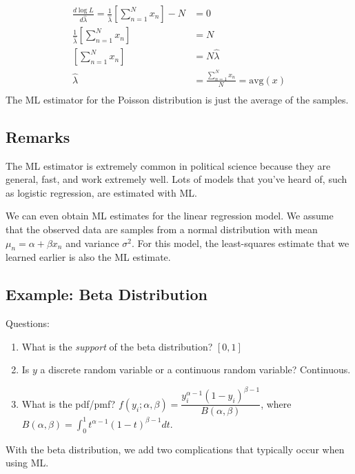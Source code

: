 \documentclass[
]{book}
\providecommand{\tightlist}{%
  \setlength{\itemsep}{0pt}\setlength{\parskip}{0pt}}
\begin{document}
\[
\begin{aligned}
\frac{d \log L}{d\hat{\lambda}} = \frac{1}{\hat{\lambda}} \left[ \sum_{n = 1}^N x_n \right] - N &= 0\\
\frac{1}{\hat{\lambda}} \left[ \sum_{n = 1}^N x_n \right] &= N \\
\left[ \sum_{n = 1}^N x_n \right] &= N \hat{\lambda} \\
\hat{\lambda} &= \frac{ \sum_{n = 1}^N x_n }{N} = \text{avg}(x)  \\
\end{aligned}
\]
The ML estimator for the Poisson distribution is just the average of the samples.

\hypertarget{remarks}{%
\subsection{Remarks}\label{remarks}}

The ML estimator is extremely common in political science because they are general, fast, and work extremely well. Lots of models that you've heard of, such as logistic regression, are estimated with ML.

We can even obtain ML estimates for the linear regression model. We assume that the observed data are samples from a normal distribution with mean \(\mu_n = \alpha + \beta x_n\) and variance \(\sigma^2\). For this model, the least-squares estimate that we learned earlier is also the ML estimate.

\hypertarget{example-beta-distribution}{%
\subsection{Example: Beta Distribution}\label{example-beta-distribution}}

Questions:

\begin{enumerate}
\def\labelenumi{\arabic{enumi}.}
\tightlist
\item
  What is the \textit{support} of the beta distribution? \([0, 1]\)
\item
  Is \(y\) a discrete random variable or a continuous random variable? Continuous.
\item
  What is the pdf/pmf? \(f(y_i; \alpha, \beta) = \dfrac{y_i^{\alpha - 1}(1 - y_i)^{\beta - 1}}{B(\alpha, \beta)}\), where \(B(\alpha, \beta) = \displaystyle \int_0^1 t^{\alpha - 1}(1 - t)^{\beta - 1}dt\).
\end{enumerate}

With the beta distribution, we add two complications that typically occur when using ML.
\end{document}

